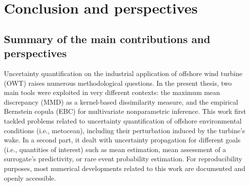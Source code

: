 \chapter*{Conclusion and perspectives}


\section*{Summary of the main contributions and perspectives}
Uncertainty quantification on the industrial application of offshore wind turbine (OWT) raises numerous methodological questions. 
In the present thesis, two main tools were exploited in very different contexts: the maximum mean discrepancy (MMD) as a kernel-based dissimilarity measure, and the empirical Bernstein copula (EBC) for multivariate nonparametric inference. 
This work first tackled problems related to uncertainty quantification of offshore environmental conditions (i.e., metocean), including their perturbation induced by the turbine's wake. 
In a second part, it dealt with uncertainty propagation for different goals (i.e., quantities of interest) such as mean estimation, mean assessment of a surrogate's predictivity, or rare event probability estimation.
For reproducibility purposes, most numerical developments related to this work are documented and openly accessible. 


